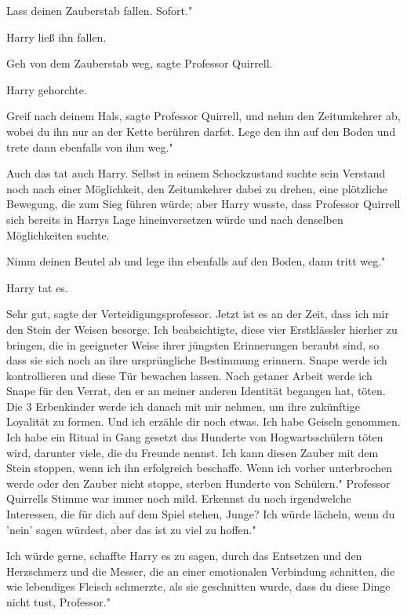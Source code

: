 \glqq{}Lass deinen Zauberstab fallen. Sofort."

Harry ließ ihn fallen.

\glqq{}Geh von dem Zauberstab weg\grqq{}, sagte Professor Quirrell.

Harry gehorchte.

\glqq{}Greif nach deinem Hals\grqq{}, sagte Professor Quirrell, \glqq{}und nehm
den Zeitumkehrer ab, wobei du ihn nur an der Kette berühren darfst. Lege den ihn
auf den Boden und trete dann ebenfalls von ihm weg."

Auch das tat auch Harry. Selbst in seinem Schockzustand suchte sein Verstand
noch nach einer Möglichkeit, den Zeitumkehrer dabei zu drehen, eine plötzliche
Bewegung, die zum Sieg führen würde; aber Harry wusste, dass Professor Quirrell
sich bereits in Harrys Lage hineinversetzen würde und nach denselben
Möglichkeiten suchte.

\glqq{}Nimm deinen Beutel ab und lege ihn ebenfalls auf den Boden, dann tritt
weg."

Harry tat es.

\glqq{}Sehr gut\grqq{}, sagte der Verteidigungsprofessor. \glqq{}Jetzt ist es an
der Zeit, dass ich mir den Stein der Weisen besorge. Ich beabsichtigte, diese
vier Erstklässler hierher zu bringen, die in geeigneter Weise ihrer jüngsten
Erinnerungen beraubt sind, so dass sie sich noch an ihre ursprüngliche
Bestimmung erinnern. Snape werde ich kontrollieren und diese Tür bewachen
lassen. Nach getaner Arbeit werde ich Snape für den Verrat, den er an meiner
anderen Identität begangen hat, töten. Die 3 Erbenkinder werde ich danach mit
mir nehmen, um ihre zukünftige Loyalität zu formen. Und ich erzähle dir noch
etwas. Ich habe Geiseln genommen. Ich habe ein Ritual in Gang gesetzt das
Hunderte von Hogwartsschülern töten wird, darunter viele, die du Freunde nennst.
Ich kann diesen Zauber mit dem Stein stoppen, wenn ich ihn erfolgreich
beschaffe. Wenn ich vorher unterbrochen werde oder den Zauber nicht stoppe,
sterben Hunderte von Schülern." Professor Quirrells Stimme war immer noch mild.
\glqq{}Erkennst du noch irgendwelche Interessen, die für dich auf dem Spiel
stehen, Junge? Ich würde lächeln, wenn du 'nein' sagen würdest, aber das ist zu
viel zu hoffen."

\glqq{}Ich würde gerne\grqq{}, schaffte Harry es zu sagen, durch das Entsetzen
und den Herzschmerz und die Messer, die an einer emotionalen Verbindung
schnitten, die wie lebendiges Fleisch schmerzte, als sie geschnitten wurde,
\glqq{}dass du diese Dinge nicht tust, Professor."

